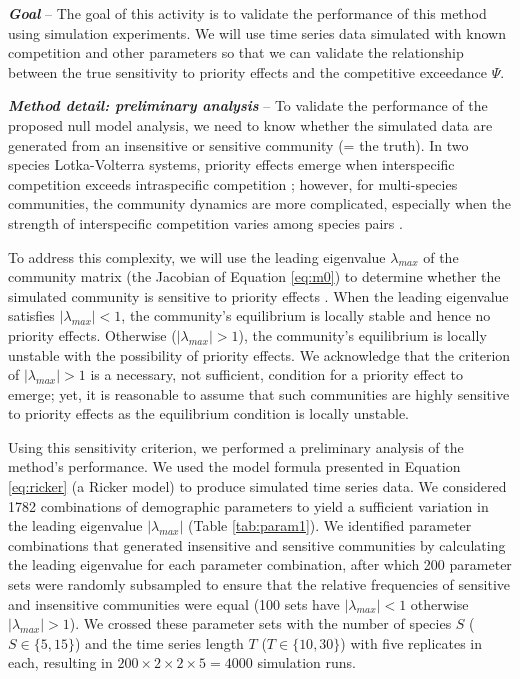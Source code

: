 \documentclass[12pt, class=article, crop=false]{standalone}
\begin{document}
\textbf{\textit{Goal}} -- 
The goal of this activity is to validate the performance of this method using simulation experiments.
We will use time series data simulated with known competition and other parameters so that we can validate the relationship between the true sensitivity to priority effects and the competitive exceedance $\Psi$.

\textbf{\textit{Method detail: preliminary analysis}} -- 
To validate the performance of the proposed null model analysis, we need to know whether the simulated data are generated from an insensitive or sensitive community (= the truth).
In two species Lotka-Volterra systems, priority effects emerge when interspecific competition exceeds intraspecific competition \citep{ke_coexistence_2018}; however, for multi-species communities, the community dynamics are more complicated, especially when the strength of interspecific competition varies among species pairs \citep{carroll_niche_2011, barabas_chessons_2018}.

To address this complexity, we will use the leading eigenvalue $\lambda_{max}$ of the community matrix (the Jacobian of Equation \ref{eq:m0}) to determine whether the simulated community is sensitive to priority effects \citep{otto_biologists_2011}.
When the leading eigenvalue satisfies $|\lambda_{max}| < 1$, the community's equilibrium is locally stable and hence no priority effects.
Otherwise ($|\lambda_{max}| > 1$), the community's equilibrium is locally unstable with the possibility of priority effects.
We acknowledge that the criterion of $|\lambda_{max}| > 1$ is a necessary, not sufficient, condition for a priority effect to emerge; yet, it is reasonable to assume that such communities are highly sensitive to priority effects as the equilibrium condition is locally unstable. 

Using this sensitivity criterion, we performed a preliminary analysis of the method's performance.
We used the model formula presented in Equation \ref{eq:ricker} (a Ricker model) to produce simulated time series data.
We considered 1782 combinations of demographic parameters to yield a sufficient variation in the leading eigenvalue $|\lambda_{max}|$ (Table \ref{tab:param1}).
We identified parameter combinations that generated insensitive and sensitive communities by calculating the leading eigenvalue for each parameter combination, after which 200 parameter sets were randomly subsampled to ensure that the relative frequencies of sensitive and insensitive communities were equal (100 sets have $|\lambda_{max}| < 1$ otherwise $|\lambda_{max}| > 1$).
We crossed these parameter sets with the number of species $S$ ($S \in \{5, 15\}$) and the time series length $T$ ($T \in \{10, 30\}$) with five replicates in each, resulting in $200 \times 2 \times 2 \times 5 = 4000$ simulation runs.
\end{document}
